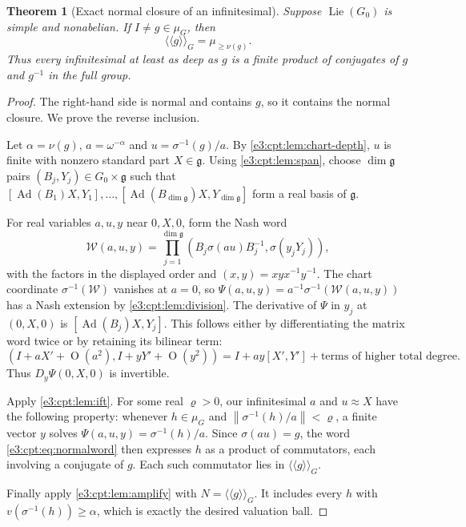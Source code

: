 \documentclass[11pt,letterpaper]{article}
\numberwithin{equation}{section}
\newtheorem{theorem}{Theorem}[section]
\theoremstyle{definition}
\theoremstyle{remark}
\newcommand{\Ad}{\operatorname{Ad}}
\newcommand{\norm}[1]{\left\lVert#1\right\rVert}
\newcommand{\smallO}{\operatorname{O}}
\newcommand{\comm}[2]{\left(#1,#2\right)}
\newcommand{\nc}[1]{\langle\!\langle #1\rangle\!\rangle}
\newcommand{\Lie}{\operatorname{Lie}}
\begin{document}
\begin{theorem}[Exact normal closure of an infinitesimal]\label{e3:cpt:thm:normalclosure}
Suppose $\Lie(G_0)$ is simple and nonabelian. If $I\ne g\in\mu_G$, then
\begin{equation}\label{e3:cpt:eq:normalclosure}
 \nc{g}_{G}=\mu_{\ge\nu(g)}.
\end{equation}
Thus every infinitesimal at least as deep as $g$ is a finite product of
conjugates of $g$ and $g^{-1}$ in the full group.
\end{theorem}
\begin{proof}
The right-hand side is normal and contains $g$, so it contains the normal
closure. We prove the reverse inclusion.

Let $\alpha=\nu(g)$, $a=\omega^{-\alpha}$ and $u=\sigma^{-1}(g)/a$. By
\cref{e3:cpt:lem:chart-depth}, $u$ is finite with nonzero standard part
$X\in\mathfrak g$. Using \cref{e3:cpt:lem:span}, choose $\dim\mathfrak g$ pairs
$(B_j,Y_j)\in G_0\times\mathfrak g$ such that
$[\Ad(B_1)X,Y_1],\ldots,[\Ad(B_{\dim\mathfrak g})X,Y_{\dim\mathfrak g}]$ form
a real basis of $\mathfrak g$.

For real variables $a,u,y$ near $0,X,0$, form the Nash word
\begin{equation}\label{e3:cpt:eq:normalword}
 \mathcal W(a,u,y)=\prod_{j=1}^{\dim\mathfrak g}
 \comm{B_j\sigma(au)B_j^{-1}}{\sigma(y_jY_j)},
\end{equation}
with the factors in the displayed order and $\comm xy=xyx^{-1}y^{-1}$. The
chart coordinate $\sigma^{-1}(\mathcal W)$ vanishes at $a=0$, so
$\Psi(a,u,y)=a^{-1}\sigma^{-1}(\mathcal W(a,u,y))$ has a Nash extension by
\cref{e3:cpt:lem:division}. The derivative of $\Psi$ in $y_j$ at $(0,X,0)$ is
$[\Ad(B_j)X,Y_j]$. This follows either by differentiating the matrix word twice
or by retaining its bilinear term:
\[
 \comm{I+aX'+\smallO(a^2)}{I+yY'+\smallO(y^2)}
 =I+ay[X',Y']+\text{terms of higher total degree}.
\]
Thus $D_y\Psi(0,X,0)$ is invertible.

Apply \cref{e3:cpt:lem:ift}. For some real $\varrho>0$, our infinitesimal $a$
and $u\approx X$ have the following property: whenever $h\in\mu_G$ and
$\norm{\sigma^{-1}(h)/a}<\varrho$, a finite vector $y$ solves
$\Psi(a,u,y)=\sigma^{-1}(h)/a$. Since $\sigma(au)=g$, the word
\cref{e3:cpt:eq:normalword} then expresses $h$ as a product of commutators,
each involving a conjugate of $g$. Each such commutator lies in $\nc{g}_G$.

Finally apply \cref{e3:cpt:lem:amplify} with $N=\nc{g}_G$. It includes every
$h$ with $v(\sigma^{-1}(h))\ge\alpha$, which is exactly the desired valuation
ball.
\end{proof}
\end{document}
